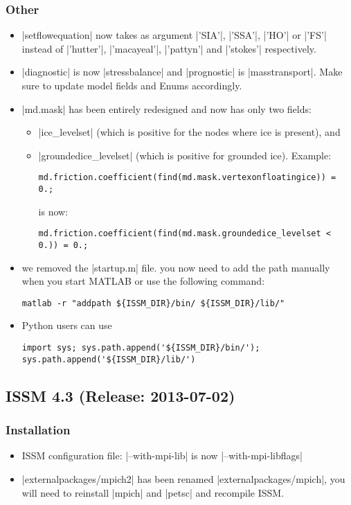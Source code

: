 \subsubsection{Other}
\begin{itemize}
\item \lstinlinebg|setflowequation| now takes as argument \lstinlinebg|'SIA'|, \lstinlinebg|'SSA'|, \lstinlinebg|'HO'| or \lstinlinebg|'FS'| instead of \lstinlinebg|'hutter'|, \lstinlinebg|'macayeal'|, \lstinlinebg|'pattyn'| and \lstinlinebg|'stokes'| respectively.
\item \lstinlinebg|diagnostic| is now \lstinlinebg|stressbalance| and \lstinlinebg|prognostic| is \lstinlinebg|masstransport|. Make sure to update model fields and Enums accordingly.
\item \lstinlinebg|md.mask| has been entirely redesigned and now has only two fields:
\begin{itemize}
\item \lstinlinebg|ice_levelset| (which is positive for the nodes where ice is present), and
\item \lstinlinebg|groundedice_levelset| (which is positive for grounded ice). Example:
\begin{lstlisting}
md.friction.coefficient(find(md.mask.vertexonfloatingice)) = 0.;
\end{lstlisting}
is now:
\begin{lstlisting}
md.friction.coefficient(find(md.mask.groundedice_levelset < 0.)) = 0.;
\end{lstlisting}
\end{itemize}
\item we removed the \lstinlinebg|startup.m| file. you now need to add the path manually when you start MATLAB or use the following command:
\begin{lstlisting}
matlab -r "addpath ${ISSM_DIR}/bin/ ${ISSM_DIR}/lib/"
\end{lstlisting}
\item Python users can use
\begin{lstlisting}
import sys; sys.path.append('${ISSM_DIR}/bin/'); sys.path.append('${ISSM_DIR}/lib/')
\end{lstlisting}
\end{itemize}

\subsection*{ISSM 4.3 (Release: 2013-07-02)}
\subsubsection{Installation}
\begin{itemize}
\item ISSM configuration file: \lstinlinebg|--with-mpi-lib| is now \lstinlinebg|--with-mpi-libflags|
\item \lstinlinebg|externalpackages/mpich2| has been renamed \lstinlinebg|externalpackages/mpich|, you will need to reinstall \lstinlinebg|mpich| and \lstinlinebg|petsc| and recompile ISSM.
\end{itemize}
